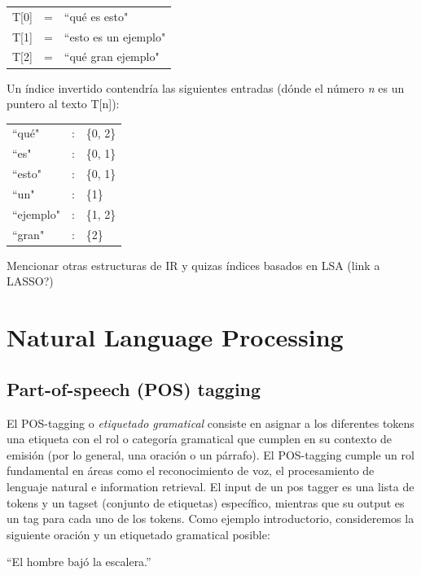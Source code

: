 \begin{tabular}{lll}
T[0] & = & ``qué es esto" \\
T[1] & = & ``esto es un ejemplo" \\
T[2] & = & ``qué gran ejemplo" \\
\end{tabular}
\medskip

Un índice invertido contendría las siguientes entradas (dónde el número \textit{n} es un puntero al texto T[n]):
\medskip %

\begin{tabular}{lll}
	``qué" & : & \{0, 2\}\\
	``es" &:& \{0, 1\}\\
	``esto" & :& \{0, 1\} \\
	``un" & :&   \{1\} \\
	``ejemplo" & :& \{1, 2\} \\
	``gran" & :& \{2\} \\
\end{tabular}
\medskip

{\color{red} Mencionar otras estructuras de IR y quizas índices basados en LSA (link a LASSO?)}


\section{Natural Language Processing}

\subsection{Part-of-speech (POS) tagging}
\label{subsec:pos}
El POS-tagging o \textit{etiquetado gramatical} consiste en asignar a los diferentes 
tokens una etiqueta con el rol o categoría gramatical que cumplen en su contexto de emisión (por lo general, una oración o un párrafo). 
El POS-tagging cumple un rol fundamental en áreas como el reconocimiento de voz, el procesamiento de lenguaje natural e information retrieval.
El input de un pos tagger es una lista de tokens y un tagset (conjunto de etiquetas) específico, mientras que su output es un tag para cada uno 
de los tokens. Como ejemplo introductorio, consideremos la siguiente oración y un etiquetado gramatical posible:

\begin{center}
{\textquotedblleft}El hombre bajó la escalera.{\textquotedblright} 
\end{center}
\medskip

